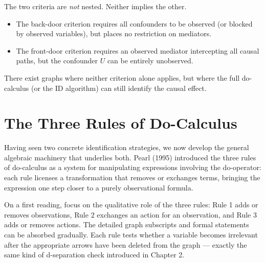 \documentclass[
  a4paper,
]{book}
\providecommand{\tightlist}{%
  \setlength{\itemsep}{0pt}\setlength{\parskip}{0pt}}
\begin{document}
\begin{tcolorbox}[enhanced jigsaw, arc=.35mm, bottomrule=.15mm, bottomtitle=1mm, breakable, colback=white, colbacktitle=quarto-callout-warning-color!10!white, colframe=quarto-callout-warning-color-frame, coltitle=black, left=2mm, leftrule=.75mm, opacityback=0, opacitybacktitle=0.6, rightrule=.15mm, title={Comparing Back-Door and Front-Door}, titlerule=0mm, toprule=.15mm, toptitle=1mm]

The two criteria are \emph{not} nested. Neither implies the other.

\begin{itemize}
\tightlist
\item
  The back-door criterion requires all confounders to be observed (or
  blocked by observed variables), but places no restriction on
  mediators.
\item
  The front-door criterion requires an observed mediator intercepting
  all causal paths, but the confounder \(U\) can be entirely unobserved.
\end{itemize}

There exist graphs where neither criterion alone applies, but where the
full do-calculus (or the ID algorithm) can still identify the causal
effect.

\end{tcolorbox}

\section{The Three Rules of Do-Calculus}\label{sec-rules}

Having seen two concrete identification strategies, we now develop the
general algebraic machinery that underlies both. Pearl (1995) introduced
the three rules of do-calculus as a system for manipulating expressions
involving the do-operator: each rule licenses a transformation that
removes or exchanges terms, bringing the expression one step closer to a
purely observational formula.

\begin{tcolorbox}[enhanced jigsaw, arc=.35mm, bottomrule=.15mm, bottomtitle=1mm, breakable, colback=white, colbacktitle=quarto-callout-note-color!10!white, colframe=quarto-callout-note-color-frame, coltitle=black, left=2mm, leftrule=.75mm, opacityback=0, opacitybacktitle=0.6, rightrule=.15mm, title={Remark: First Reading / Second Reading}, titlerule=0mm, toprule=.15mm, toptitle=1mm]

On a first reading, focus on the qualitative role of the three rules:
Rule 1 adds or removes observations, Rule 2 exchanges an action for an
observation, and Rule 3 adds or removes actions. The detailed graph
subscripts and formal statements can be absorbed gradually. Each rule
tests whether a variable becomes irrelevant after the appropriate arrows
have been deleted from the graph --- exactly the same kind of
d-separation check introduced in Chapter 2.

\end{tcolorbox}
\end{document}
